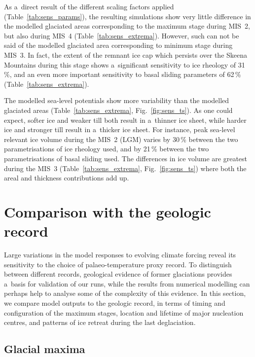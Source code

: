 \documentclass[tc, manuscript]{copernicus}
\begin{document}
      As a~direct result of the different scaling factors applied
      (Table~\ref{tab:sens_params}), the resulting simulations show very
      little difference in the modelled glaciated areas corresponding to
      the maximum stage during MIS~2, but also during MIS~4
      (Table~\ref{tab:sens_extrema}). However, such can not be said of the
      modelled glaciated area corresponding to minimum stage during
      MIS~3. In fact, the extent of the remnant ice cap which persists over
      the Skeena Mountains during this stage shows a~significant sensitivity
      to ice rheology of 31\,\unit{\%}, and an even more important
      sensitivity to basal sliding parameters of 62\,\unit{\%}
      (Table~\ref{tab:sens_extrema}).

      The modelled sea-level potentials show more variability than
      the modelled glaciated areas (Table~\ref{tab:sens_extrema},
      Fig.~\ref{fig:sens_ts}). As one could expect, softer ice and weaker
      till both result in a~thinner ice sheet, while harder ice and stronger
      till result in a~thicker ice sheet. For instance, peak sea-level
      relevant ice volume
      during the MIS~2 (LGM) varies by 30\,\unit{\%} between the two
      parametrisations of ice rheology used, and by 21\,\unit{\%} between
      the two parametrisations of basal sliding used. The differences in
      ice volume are greatest during the MIS~3
      (Table~\ref{tab:sens_extrema}, Fig.~\ref{fig:sens_ts}) where both the
      areal and thickness contributions add up.


\section{Comparison with the geologic record}
\label{sec:discussion}

      Large variations in the model responses to evolving climate forcing
      reveal its sensitivity to the choice of palaeo-temperature proxy
      record. To distinguish between different records, geological evidence
      of former glaciations provides a~basis for validation of our runs,
      while the results from numerical modelling can perhaps help to analyse
      some of the complexity of this evidence. In this section, we compare
      model outputs to the geologic record, in terms of timing and
      configuration of the maximum stages, location and lifetime of major
      nucleation centres, and patterns of ice retreat during the last
      deglaciation.

\subsection{Glacial maxima}
\end{document}

